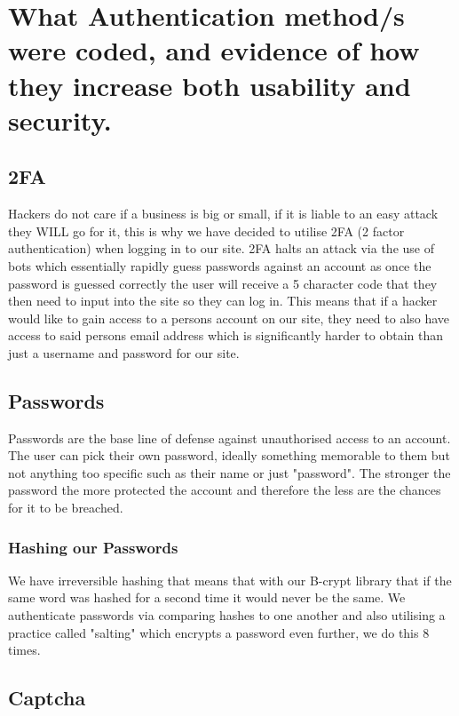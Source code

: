 \documentclass{ueacmpstyle}
\begin{document}
	
	\section{What Authentication method/s were coded, and evidence of how they increase both
		usability and security.}
	
	\subsection{2FA}
	
	Hackers do not care if a business is big or small, if it is liable to an easy attack they WILL go for it, this is why we have decided to utilise 2FA (2 factor authentication) when logging in to our site. 2FA halts an attack via the use of bots which essentially rapidly guess passwords against an account as once the password is guessed correctly the user will receive a 5 character code that they then need to input into the site so they can log in. This means that if a hacker would like to gain access to a persons account on our site, they need to also have access to said persons email address which is significantly harder to obtain than just a username and password for our site.
	
	\subsection{Passwords}
	
	Passwords are the base line of defense against unauthorised access to an account. The user can pick their own password, ideally something memorable to them but not anything too specific such as their name or just "password". The stronger the password the more protected the account and therefore the less are the chances for it to be breached.
	
	\subsubsection{Hashing our Passwords}
	
	We have irreversible hashing that means that with our B-crypt \cite{bcrypt} library that if the same word was hashed for a second time it would never be the same. We authenticate passwords via comparing hashes to one another and also utilising a practice called "salting" which encrypts a password even further, we do this 8 times.
	
	\subsection{Captcha}
	
\end{document}
